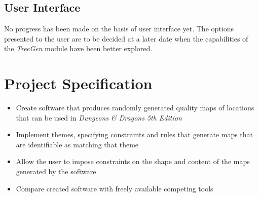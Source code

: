 \documentclass{article}
\begin{document}
\subsection{User Interface}
No progress has been made on the basis of user interface yet. The options presented to the user are to be decided at a later date when the capabilities of the \textit{TreeGen} module have been better explored. 


\pagebreak

\appendix
\section{Project Specification}

\begin{itemize}
    \item Create software that produces randomly generated quality maps of locations that can be used in \textit{Dungeons \& Dragons 5th Edition}
    \item Implement themes, specifying constraints and rules that generate maps that are identifiable as matching that theme
    \item Allow the user to impose constraints on the shape and content of the maps generated by the software
    \item Compare created software with freely available competing tools
\end{itemize}
\end{document}
